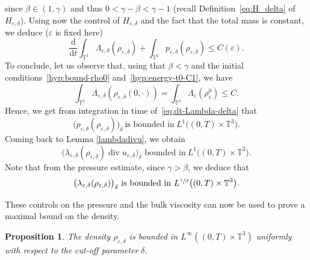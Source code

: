 \documentclass[JEP,XML,SOM,Unicode,NoEqCountersInSection]{cedram}
\newcommand{\<}{\bigl\langle}
\renewcommand{\>}{\bigr\rangle}
\newcommand{\labeleq}[1]{}
\newtheorem{prop}[thm]{Proposition}
\theoremstyle{definition}
\theoremstyle{remark}
\newcommand{\TT}{\mathbb{T}^3}
\DeclareMathOperator{\Div}{div}
\newcommand{\Dt}{\dfrac{\mathrm{d}}{\mathrm{d} t}}
\let\ep\varepsilon
\begin{document}
since $\beta \in (1,\gamma)$ and thus $0 < \gamma - \beta < \gamma - 1$ (recall Definition~\eqref{eq:H_delta} of $H_{\ep,\delta}$).
Using now the control of $H_{\ep,\delta}$ and the fact that the total mass is constant, we deduce ($\ep$ is fixed here)
\[
\Dt \int_{\TT}{\Lambda_{\ep,\delta}(\rho_{\ep,\delta})} + \int_{\TT}{p_{\ep,\delta}(\rho_{\ep,\delta})}
\leq C(\ep).
\]
To conclude, let us observe that, using that $\beta <\gamma$ and the initial conditions~\eqref{hyp:bound-rho0} and~\eqref{hyp:energy-t0-C1}, we have
\begin{equation*}
\int_{\TT}{\Lambda_{\ep,\delta}(\rho_{\ep,\delta}(0,\cdot)) }
= \int_{\TT}{\Lambda_{\ep}(\rho_\ep^0) }
\leq C.
\end{equation*}
Hence, we get from integration in time of~\eqref{eq:dt-Lambda-delta} that
\begin{equation*}\labeleq{bound-p-delta}
\big(p_{\ep,\delta}(\rho_{\ep,\delta})\big)_\delta~ \text{is bounded in} ~L^1\big((0,T)\times \TT \big).
\end{equation*}
Coming back to Lemma \ref{lambdadivu}, we obtain
\begin{equation*}\label{bound-lambdadivu-delta}
\big(\lambda_{\ep,\delta}(\rho_{\ep,\delta}) \Div u_{\ep,\delta}\big)_\delta \text{ bounded in}~ L^1\big((0,T)\times \TT\big).
\end{equation*}
Note that from the pressure estimate, since $\gamma > \beta$, we deduce that
\begin{equation*}\label{bound-lambda-delta}
\big(\lambda_{\ep,\delta}(\rho_{\ep,\delta})\big)_\delta ~ \text{is bounded in} ~L^{\sfrac{\gamma}{\beta}}\big((0,T)\times \TT \big).
\end{equation*}

These controls on the pressure and the bulk viscosity can now be used to prove a maximal bound on the density.
\begin{prop}\label{prop:bound_rhodelta}
The density $\rho_{\ep,\delta}$ is bounded in $L^\infty((0,T)\times \TT)$ uniformly with respect to the cut-off parameter $\delta$.
\end{prop}
\end{document}
